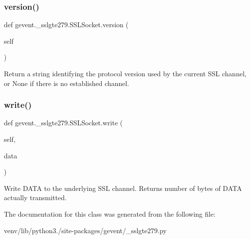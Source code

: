 \subsubsection{\texorpdfstring{version()}{version()}}
{\footnotesize\ttfamily def gevent.\+\_\+sslgte279.\+S\+S\+L\+Socket.\+version (\begin{DoxyParamCaption}\item[{}]{self }\end{DoxyParamCaption})}

\begin{DoxyVerb}Return a string identifying the protocol version used by the
current SSL channel, or None if there is no established channel.
\end{DoxyVerb}
 \mbox{\label{classgevent_1_1__sslgte279_1_1_s_s_l_socket_a55804d5dfc2119e25dc26614c9e00076}} 
\subsubsection{\texorpdfstring{write()}{write()}}
{\footnotesize\ttfamily def gevent.\+\_\+sslgte279.\+S\+S\+L\+Socket.\+write (\begin{DoxyParamCaption}\item[{}]{self,  }\item[{}]{data }\end{DoxyParamCaption})}

\begin{DoxyVerb}Write DATA to the underlying SSL channel.  Returns
number of bytes of DATA actually transmitted.\end{DoxyVerb}
 

The documentation for this class was generated from the following file\+:\begin{DoxyCompactItemize}
\item 
venv/lib/python3./site-\/packages/gevent/\+\_\+sslgte279.\+py\end{DoxyCompactItemize}
